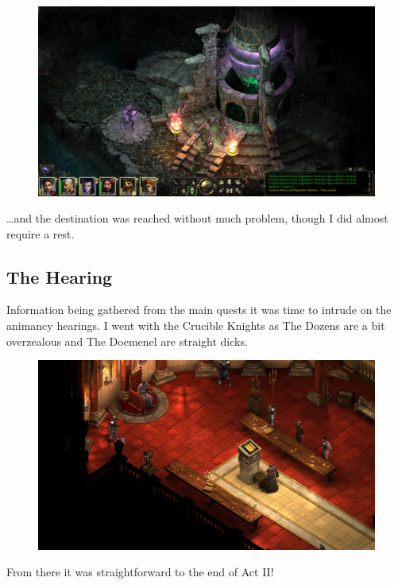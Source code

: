 \documentclass{article}
\begin{document}
\begin{figure}
\includegraphics[scale=0.33]{files/blog/2018_11_25_pillars_of_eternity_path_of_the_damned_act_ii/2018_11_25_cliabanrilag3.jpg}
\end{figure}

\ldots and the destination was reached without much problem, though I did almost require a rest.

\subsection{The Hearing}
Information being gathered from the main quests it was time to intrude on the animancy hearings.  I went with the Crucible Knights as The Dozens are a bit overzealous and The Doemenel are straight dicks.

\begin{figure}
\includegraphics[scale=0.33]{files/blog/2018_11_25_pillars_of_eternity_path_of_the_damned_act_ii/2018_11_25_hearing.jpg}
\end{figure}

From there it was straightforward to the end of Act II!
\end{document}
